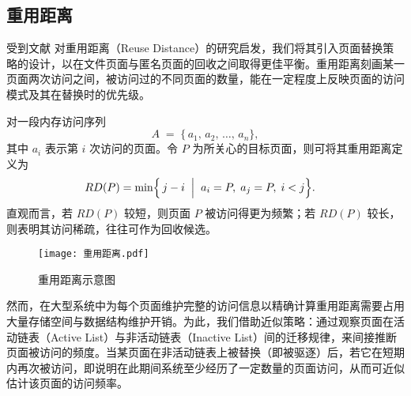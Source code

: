 

\subsection{重用距离}

受到文献 \cite{jiang2002lirs,jiang2005clockpro} 对重用距离（Reuse Distance）的研究启发，我们将其引入页面替换策略的设计，以在文件页面与匿名页面的回收之间取得更佳平衡。重用距离刻画某一页面两次访问之间，被访问过的不同页面的数量，能在一定程度上反映页面的访问模式及其在替换时的优先级。

对一段内存访问序列
\[
  A \;=\;\{\,a_1,\,a_2,\,\dots,\,a_n\},
\]
其中 \(a_i\) 表示第 \(i\) 次访问的页面。令 \(P\) 为所关心的目标页面，则可将其重用距离定义为
\begin{align}
\label{eq:rd_def}
  RD(P) 
  &= 
  \min\Bigl\{\,j - i
    \;\Bigm|\;
    a_i = P,\;
    a_j = P,\;
    i < j
  \Bigr\}.
\end{align}
直观而言，若 \(RD(P)\) 较短，则页面 \(P\) 被访问得更为频繁；若 \(RD(P)\) 较长，则表明其访问稀疏，往往可作为回收候选。

\begin{figure}[htbp]
  \centering
  \texttt{[image: 重用距离.pdf]}
  \caption{重用距离示意图}
  \label{fig:refault_distance}
\end{figure}

然而，在大型系统中为每个页面维护完整的访问信息以精确计算重用距离需要占用大量存储空间与数据结构维护开销。为此，我们借助近似策略：通过观察页面在活动链表（Active List）与非活动链表（Inactive List）间的迁移规律，来间接推断页面被访问的频度。当某页面在非活动链表上被替换（即被驱逐）后，若它在短期内再次被访问，即说明在此期间系统至少经历了一定数量的页面访问，从而可近似估计该页面的访问频率。


